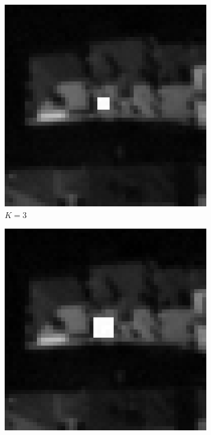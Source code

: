 \begin{figure}[H]
	\centering
	\begin{subfigure}{.15\linewidth}
		\includegraphics[width=1\textwidth]{img/testOcclusion1}
		\caption{{$K=3$}}
	\end{subfigure}
	\begin{subfigure}{.15\linewidth}
		\includegraphics[width=1\textwidth]{img/testOcclusion2}

\end{subfigure}
\end{figure}
